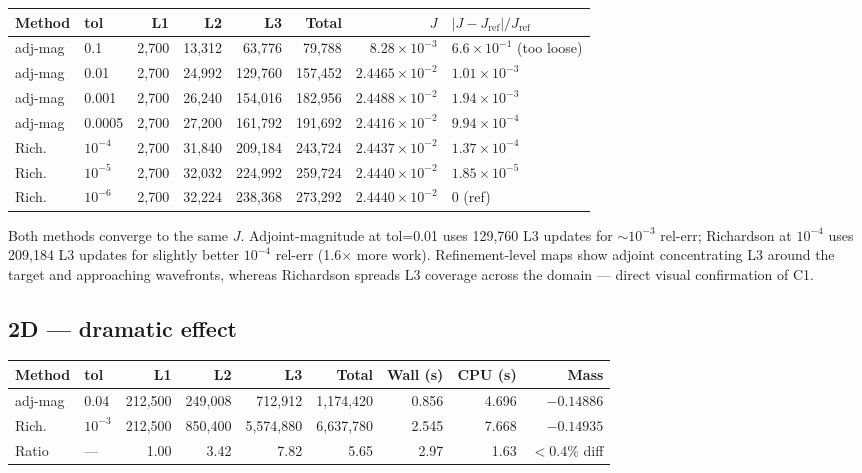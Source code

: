 \documentclass[11pt]{article}
\begin{document}
\begin{table}[h]
\centering\small
\begin{tabular}{llrrrrrl}
\toprule
Method & tol & L1 & L2 & L3 & Total & $J$ & $|J-J_{\text{ref}}|/J_{\text{ref}}$ \\
\midrule
adj-mag  & 0.1     & 2{,}700 &  13{,}312 &  63{,}776 &  79{,}788 & $8.28\!\times\!10^{-3}$ & $6.6\!\times\!10^{-1}$ (too loose) \\
adj-mag  & 0.01    & 2{,}700 &  24{,}992 & 129{,}760 & 157{,}452 & $2.4465\!\times\!10^{-2}$ & $1.01\!\times\!10^{-3}$ \\
adj-mag  & 0.001   & 2{,}700 &  26{,}240 & 154{,}016 & 182{,}956 & $2.4488\!\times\!10^{-2}$ & $1.94\!\times\!10^{-3}$ \\
adj-mag  & 0.0005  & 2{,}700 &  27{,}200 & 161{,}792 & 191{,}692 & $2.4416\!\times\!10^{-2}$ & $9.94\!\times\!10^{-4}$ \\
Rich.    & $10^{-4}$ & 2{,}700 &  31{,}840 & 209{,}184 & 243{,}724 & $2.4437\!\times\!10^{-2}$ & $1.37\!\times\!10^{-4}$ \\
Rich.    & $10^{-5}$ & 2{,}700 &  32{,}032 & 224{,}992 & 259{,}724 & $2.4440\!\times\!10^{-2}$ & $1.85\!\times\!10^{-5}$ \\
Rich.    & $10^{-6}$ & 2{,}700 &  32{,}224 & 238{,}368 & 273{,}292 & $2.4440\!\times\!10^{-2}$ & 0 (ref) \\
\bottomrule
\end{tabular}
\end{table}

Both methods converge to the same $J$. Adjoint-magnitude at tol=0.01
uses 129{,}760 L3 updates for $\sim 10^{-3}$ rel-err; Richardson at
$10^{-4}$ uses 209{,}184 L3 updates for slightly better $10^{-4}$ rel-err
(1.6$\times$ more work). Refinement-level maps show adjoint concentrating L3
around the target and approaching wavefronts, whereas Richardson spreads L3
coverage across the domain --- direct visual confirmation of C1.

\subsection{2D --- dramatic effect}

\begin{table}[h]
\centering\small
\begin{tabular}{llrrrrrrr}
\toprule
Method & tol & L1 & L2 & L3 & Total & Wall (s) & CPU (s) & Mass \\
\midrule
adj-mag  & 0.04     & 212{,}500 & 249{,}008 &   712{,}912 & 1{,}174{,}420 & 0.856 & 4.696 & $-0.14886$ \\
Rich.    & $10^{-3}$ & 212{,}500 & 850{,}400 & 5{,}574{,}880 & 6{,}637{,}780 & 2.545 & 7.668 & $-0.14935$ \\
Ratio    & ---       & 1.00 & 3.42 & 7.82 & 5.65 & 2.97 & 1.63 & $<0.4\%$ diff \\
\bottomrule
\end{tabular}
\end{table}
\end{document}
